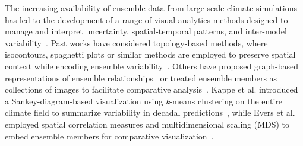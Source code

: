 The increasing availability of ensemble data from large-scale climate simulations has led to the development of a range of visual analytics methods designed to manage and interpret uncertainty, spatial-temporal patterns, and inter-model variability~\cite{kehrer_brushing_2010, biswas_visualization_2017, ferstl_time-hierarchical_2017, wang_multi-resolution_2017,biswas2016visualization, kappe_exploring_2019}. 
%
%
%
%
Past works have considered topology-based methods, where isocontours, spaghetti plots or similar methods are employed to preserve spatial context while encoding ensemble variability~\cite{kappe_topology-based_2019,kappe_topology-based_2022, liu_visualizing_2015, sanyal_noodles_2010, ma_interactive_2019}.
Others have proposed graph-based representations of ensemble relationships~\cite{shu2016ensemblegraph, kappe_analysis_2019} or treated ensemble members as collections of images to facilitate comparative analysis~\cite{ise_varenn_2020}.
%
%
Kappe et al. introduced a Sankey-diagram-based visualization using \textit{k}-means clustering on the entire climate field to summarize variability in decadal predictions~\cite{kappe_exploring_2019}, while Evers et al. employed spatial correlation measures and multidimensional scaling (MDS) to embed ensemble members for comparative visualization~\cite{evers_uncertaintyaware_2021}.
%
%
%
%

